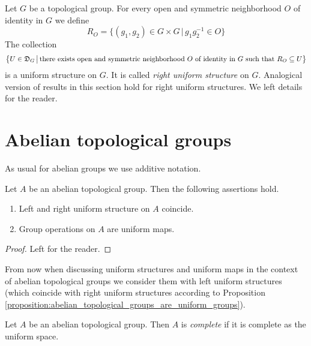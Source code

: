 \documentclass[10pt]{amsart}
\begin{document}
\begin{remark}\label{remark:right_uniform_structure}
	Let $G$ be a topological group. For every open and symmetric neighborhood $O$ of identity in $G$ we define
	$$R_O = \big\{(g_1,g_2)\in G\times G\,\big|\,g_1g_2^{-1} \in O\big\}$$
	The collection
	$$\big\{U \in {\mathfrak D}_G\,\big|\,\mbox{there exists open and symmetric neighborhood }O\mbox{ of identity in }G\mbox{ such that }R_O\subseteq U\big\}$$
	is a uniform structure on $G$. It is called \textit{right uniform structure} on $G$. Analogical version of results in this section hold for right uniform structures. We left details for the reader.
\end{remark}

\section{Abelian topological groups}
\noindent
As usual for abelian groups we use additive notation.

\begin{proposition}\label{proposition:abelian_topological_groups_are_uniform_groups}
	Let $A$ be an abelian topological group. Then the following assertions hold.
	\begin{enumerate}[label=\emph{\textbf{(\arabic*)}}, leftmargin=3.0em]
		\item Left and right uniform structure on $A$ coincide.
		\item Group operations on $A$ are uniform maps.
	\end{enumerate}
\end{proposition}
\begin{proof}
	Left for the reader.
\end{proof}
\noindent
From now when discussing uniform structures and uniform maps in the context of abelian topological groups we consider them with left uniform structures (which coincide with right uniform structures according to Proposition \ref{proposition:abelian_topological_groups_are_uniform_groups}).

\begin{definition}
	Let $A$ be an abelian topological group. Then $A$ is \textit{complete} if it is complete as the uniform space.
\end{definition}
\end{document}
